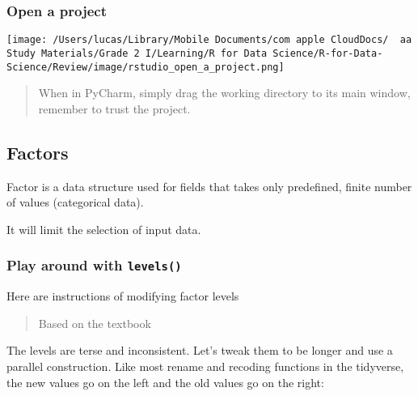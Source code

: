 \documentclass[
]{article}
\begin{document}
\hypertarget{open-a-project}{%
\subsubsection{Open a project}\label{open-a-project}}

\texttt{[image: /Users/lucas/Library/Mobile Documents/com~apple~CloudDocs/~~aa Study Materials/Grade 2 I/Learning/R for Data Science/R-for-Data-Science/Review/image/rstudio\_open\_a\_project.png]}

\begin{quote}
When in PyCharm, simply drag the working directory to its main window,
remember to trust the project.
\end{quote}

\hypertarget{factors}{%
\subsection{Factors}\label{factors}}

Factor is a data structure used for fields that takes only predefined,
finite number of values (categorical data).

It will limit the selection of input data.

\hypertarget{play-around-with-levels}{%
\subsubsection{\texorpdfstring{Play around with
\texttt{levels()}}{Play around with levels()}}\label{play-around-with-levels}}

Here are instructions of modifying factor levels

\begin{quote}
Based on the textbook
\end{quote}

The levels are terse and inconsistent. Let's tweak them to be longer and
use a parallel construction. Like most rename and recoding functions in
the tidyverse, the new values go on the left and the old values go on
the right:
\end{document}
